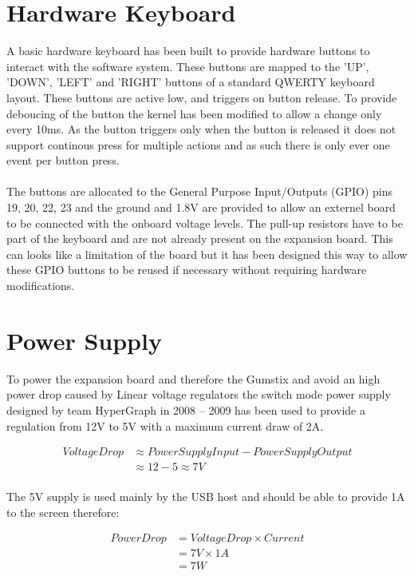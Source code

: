 \documentclass[11pt]{report} %
\begin{document}
	\section{Hardware Keyboard}
	A basic hardware keyboard has been built to provide hardware buttons to 
	interact with the software system. These buttons are mapped to the 'UP',
	'DOWN', 'LEFT' and 'RIGHT' buttons of a standard QWERTY keyboard layout.
	These buttons are active low, and triggers on button release. To provide
	deboucing of the button the kernel has been modified to allow a change only 
	every 10ms. As the button triggers only when the button is released it does not
	support continous press for multiple actions and as such there is only ever
	one event per button press.\\
	\\
	The buttons are allocated to the General Purpose Input/Outputs (GPIO) pins 19, 
	20, 22, 23 and the ground and 1.8V are provided to allow an externel board to
	be connected with the onboard voltage levels. The pull-up resistors have to be
	part of the keyboard and are not already present on the expansion board.
	This can looks like a limitation of the board but it has been designed this way
	to allow these GPIO buttons to be reused if necessary without requiring
	hardware modifications.
	
	\section{Power Supply}
	To power the expansion board and therefore the Gumstix and avoid an high power
	drop caused by Linear voltage regulators the switch mode power supply designed by
	team HyperGraph in 2008 -- 2009 has been used to provide a regulation from 12V
	to 5V with a maximum current draw of 2A.

	\begin{equation}
	\begin{aligned}
	VoltageDrop&\approx PowerSupplyInput - PowerSupplyOutput\\
	&\approx 12 - 5 \approx  7V\\
	\end{aligned}
	\end{equation}

	The 5V supply is used mainly by the USB host and should be able to provide 1A
	to the screen therefore:

	\begin{equation}
	\begin{aligned}
	PowerDrop &= VoltageDrop \times Current\\
	&= 7V \times 1A\\
	&= 7W
	\end{aligned}
	\end{equation}
\end{document}
